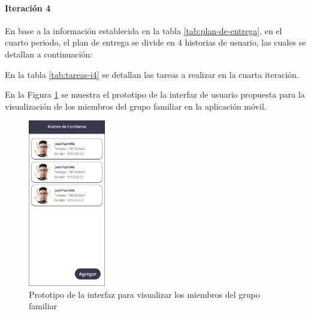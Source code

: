 \paragraph{Iteración 4}

En base a la información establecida en la tabla \ref{tab:plan-de-entrega}, en el cuarto periodo, el plan de
entrega se divide en 4 historias de usuario, las cuales se detallan a continuación:



En la tabla \ref{tab:tareas-i4} se detallan las tareas a realizar en la cuarta iteración.




En la Figura \ref{fig:prototipo-grupo-familiar-mobile} se muestra el prototipo de la interfaz de usuario propuesta para
la visualización de los miembros del grupo familiar en la aplicación móvil.

\begin{figure}[H]
      \centering
      \includegraphics[width=0.3\textwidth]{chapters/III-resultados-y-discusion/resources/images/prototipo-grupo-familiar-mobile.png}
      \caption{Prototipo de la interfaz para visualizar los miembros del grupo familiar}
      \label{fig:prototipo-grupo-familiar-mobile}
\end{figure}

